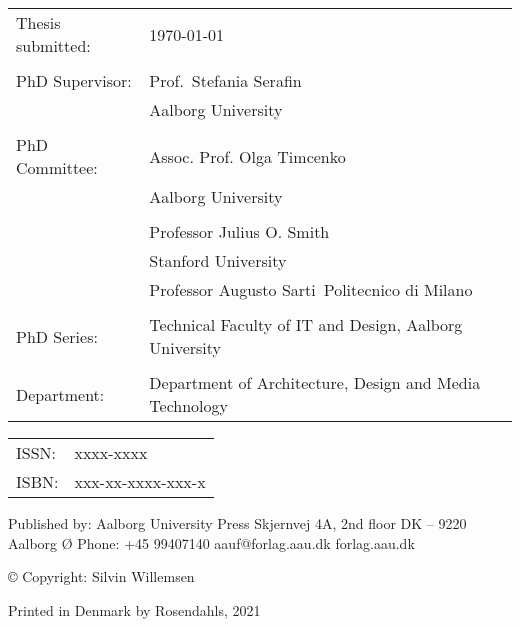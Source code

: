 \thispagestyle{empty}
\noindent
\fontsize{9.5}{12}\selectfont %
\begin{tabularx}{\textwidth}{@{}lX}
    Thesis submitted: & \today\\
    \\
    PhD Supervisor: & Prof.\ Stefania Serafin\\
                    & Aalborg University\\
                    \\
    PhD Committee: & Assoc. Prof. Olga Timcenko\\
    &Aalborg University\\
    &\\
                   & Professor Julius O. Smith \\
                &Stanford University\\
                   & Professor Augusto Sarti\ Politecnico di Milano\\
                   \\
    PhD Series:    & Technical Faculty of IT and Design, Aalborg University\\
    \\
    Department: & Department of Architecture, Design and Media Technology
\end{tabularx}
\normalsize
\strut\vfill
\noindent
\begin{tabularx}{\textwidth}{@{}lX}
    ISSN: & xxxx-xxxx\\
    ISBN: & xxx-xx-xxxx-xxx-x\\
\end{tabularx}
\strut\vfill
\noindent Published by:\newline
Aalborg University Press\newline
Skjernvej 4A, 2nd floor\newline
DK – 9220 Aalborg Ø\newline
Phone: +45 99407140\newline
aauf@forlag.aau.dk\newline
forlag.aau.dk
\strut\vfill
\noindent \copyright{} Copyright: Silvin Willemsen\newline
\strut\vfill
\noindent Printed in Denmark by Rosendahls, 2021
\clearpage

